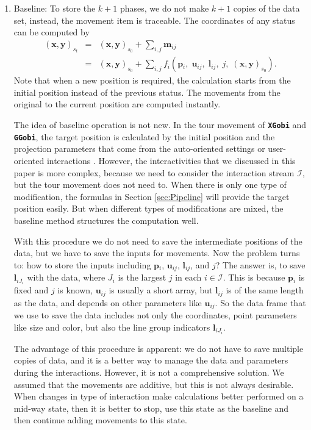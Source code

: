 \documentclass[12pt]{article}
\begin{document}
\begin{enumerate}
\item Baseline: To store the $k+1$ phases, we do not make $k+1$
copies of the data set, instead, the movement item is traceable. The
coordinates of any status can be computed by
\begin{eqnarray*}
 (\mathbf{x},\mathbf{y})_{s_{t}} & = &  (\mathbf{x},\mathbf{y})_{s_{0}}+\sum_{i,j}\mathbf{m}{}_{ij}\\
 & = &  (\mathbf{x},\mathbf{y})_{s_{0}}+\sum_{i,j}f_{i} (\mathbf{p}{}_{i},\;\mathbf{u}{}_{ij},\;\mathbf{l}_{ij},\; j,\; (\mathbf{x},\mathbf{y})_{s_0}).
\end{eqnarray*}
Note that when a new position is required, the calculation starts
from the initial position instead of the previous status. The movements
from the original to the current position are computed instantly.

The idea of baseline operation is not new. In the tour movement
of \texttt{\textbf{XGobi}} and \texttt{\textbf{GGobi}}, the target
position is calculated by the initial position and the projection
parameters that come from the auto-oriented settings or
user-oriented interactions \citep{cook1995grand, cook1997manual}.
However, the interactivities that we discussed in this paper is
more complex, because we need to consider the interaction stream
$\mathcal{I}$, but the tour movement does not need to.
When there is only one type of modification, the formulas in
Section \ref{sec:Pipeline}%
will provide the target position easily.
 But when different types of modifications
are mixed, the baseline method structures the computation well.

With this procedure we do not need to save the intermediate
positions of the data, but we have to save the inputs for movements.
Now the problem turns to: how to store the inputs including
$\mathbf{p}{}_{i}$, $\mathbf{u}{}_{ij}$, $\mathbf{l}_{ij}$, and $j$? The answer is,
to save $\mathbf{l}_{iJ_i}$ with the data, where $J_i$ is the largest
$j$ in each $i \in \mathcal{I}$. This is because $\mathbf{p}{}_{i}$
is fixed and $j$ is known, $\mathbf{u}{}_{ij}$ is usually a short array,
but $\mathbf{l}_{ij}$ is of the same length as the data, and depends
on other parameters like $\mathbf{u}{}_{ij}$. So the data frame that
we use to save the data includes not only the coordinates, point parameters
like size and color, but also the line group indicators $\mathbf{l}_{iJ_i}$.

The advantage of this procedure is apparent: we do not have
to save multiple copies of data, and it is a better way to manage
the data and parameters during the interactions. However, it is not a comprehensive solution. We assumed that the movements are additive, but this is not always desirable. When changes in type of interaction make calculations better performed on a mid-way state, then it is better to stop, use this state as the baseline and then continue adding movements to this state.


\end{enumerate}
\end{document}
